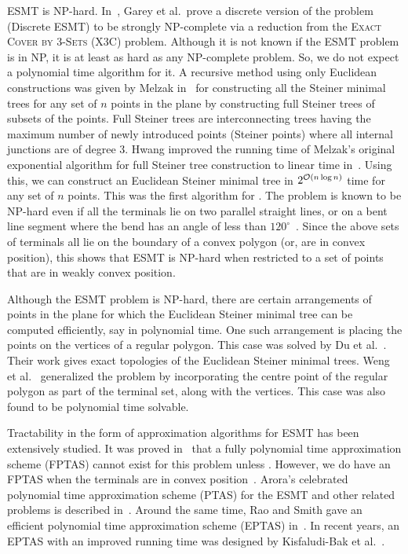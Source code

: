  ESMT is NP-hard. In~\cite{garey1977complexity}, Garey et al.~prove a discrete version of the problem (Discrete ESMT) to be strongly NP-complete via a reduction from the \textsc{Exact Cover by 3-Sets} (X3C) problem. Although it is not known if the ESMT problem is in NP, it is at least as hard as any NP-complete problem. So, we do not expect a polynomial time algorithm for it. A recursive method using only Euclidean constructions was given by Melzak in~\cite{melzak1961problem} for constructing all the Steiner minimal trees for any set of $n$ points in the plane by constructing full Steiner trees of subsets of the points. Full Steiner trees are interconnecting trees having the maximum number of newly introduced points (Steiner points) where all internal junctions are of degree $3$. Hwang improved the running time of Melzak’s original exponential algorithm for full Steiner tree construction to linear time in~\cite{hwang1986linear}. Using this, we can construct an Euclidean Steiner minimal tree in $2^{\mathcal{O}(n\log n)}$ time for any set of $n$ points. This was the first algorithm for \ESMT. The problem is known to be NP-hard even if all the terminals lie on two parallel straight lines, or on a bent line segment where the bend has an angle of less than $120^\circ$~\cite{rubinstein1997steiner}. Since the above sets of terminals all lie on the boundary of a convex polygon (or, are in convex position), this shows that ESMT is NP-hard when restricted to a set of points that are in weakly convex position.

 Although the ESMT problem is NP-hard, there are certain arrangements of points in the plane for which the Euclidean Steiner minimal tree can be computed efficiently, say in polynomial time. One such arrangement is placing the points on the vertices of a regular polygon. This case was solved by Du et al.~\cite{du1987steiner}. Their work gives exact topologies of the Euclidean Steiner minimal trees. Weng et al.~\cite{weng1995steiner} generalized the problem by incorporating the centre point of the regular polygon as part of the terminal set, along with the vertices. This case was also found to be polynomial time solvable.

Tractability in the form of approximation algorithms for ESMT has been extensively studied. It was proved in~\cite{garey1977complexity} that a fully polynomial time approximation scheme (FPTAS) cannot exist for this problem unless \pnp. However, we do have an FPTAS when the terminals are in convex position~\cite{scott1988convexity}. Arora's celebrated polynomial time approximation scheme (PTAS) for the ESMT and other related problems is described in~\cite{arora1998polynomial}. Around the same time, Rao and Smith gave an efficient polynomial time approximation scheme (EPTAS) in~\cite{rao1998approximating}. In recent years, an EPTAS with an improved running time was designed by Kisfaludi-Bak et al.~\cite{kisfaludi2022gap}. 
